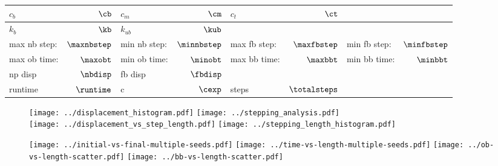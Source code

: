 \documentclass[]{article}
\begin{document}
\begin{table}[tbhp]
  \centering
  \begin{tabular}{|lr|lr|lr|lr|}
    \toprule
    $c_b$ & $\cb$ &
    $c_m$ & $\cm$ &
    $c_t$ & $\ct$ & &\\
    \midrule
    $k_b$ & $\kb$ &
    $k_{ub}$ & $\kub$ & & & &\\
    \midrule
    max nb step: & $\maxnbstep$ &
    min nb step: & $\minnbstep$ &
    max fb step: & $\maxfbstep$ &
    min fb step: & $\minfbstep$\\
    \midrule
    max ob time: & $\maxobt$ &
    min ob time: & $\minobt$ &
    max bb time: & $\maxbbt$ &
    min bb time: & $\minbbt$\\
    \midrule
    np disp & $\nbdisp$ &
    fb disp & $\fbdisp$ & & & &\\
    \midrule
    runtime & $\runtime$ &
    c & $\cexp$ &
    steps & $\totalsteps$ & &\\
    \midrule
  \end{tabular}
\end{table}

\begin{figure}[tbhp]
  \centering
  \texttt{[image: ../displacement\_histogram.pdf]}%
  \texttt{[image: ../stepping\_analysis.pdf]}\\
  \texttt{[image: ../displacement\_vs\_step\_length.pdf]}%
  \texttt{[image: ../stepping\_length\_histogram.pdf]}
\end{figure}

\begin{figure}[tbhp]
  \texttt{[image: ../initial-vs-final-multiple-seeds.pdf]}%
  \texttt{[image: ../time-vs-length-multiple-seeds.pdf]}
  \texttt{[image: ../ob-vs-length-scatter.pdf]}%
  \texttt{[image: ../bb-vs-length-scatter.pdf]}
\end{figure}
\end{document}
